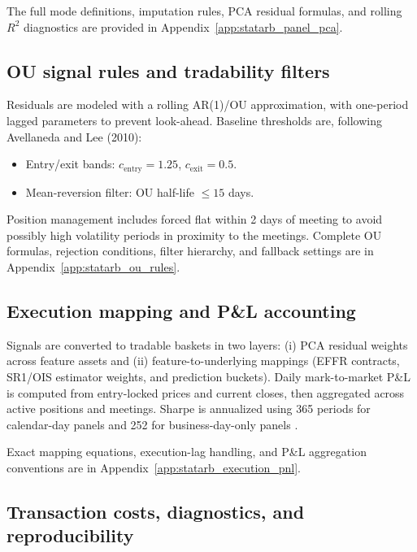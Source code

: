 The full mode definitions, imputation rules, PCA residual formulas, and rolling $R^2$ diagnostics are provided in Appendix~\ref{app:statarb_panel_pca}.

\subsection{OU signal rules and tradability filters}

Residuals are modeled with a rolling AR(1)/OU approximation, with one-period lagged parameters to prevent look-ahead. Baseline thresholds are, following Avellaneda and Lee (2010):
\begin{itemize}
    \item Entry/exit bands: $c_{\text{entry}}=1.25$, $c_{\text{exit}}=0.5$.
    \item Mean-reversion filter: OU half-life $\le 15$ days.
\end{itemize}
Position management includes forced flat within 2 days of meeting to avoid possibly high volatility periods in proximity to the meetings. Complete OU formulas, rejection conditions, filter hierarchy, and fallback settings are in Appendix~\ref{app:statarb_ou_rules}.

\subsection{Execution mapping and P\&L accounting}

Signals are converted to tradable baskets in two layers: (i) PCA residual weights across feature assets and (ii) feature-to-underlying mappings (EFFR contracts, SR1/OIS estimator weights, and prediction buckets). Daily mark-to-market P\&L is computed from entry-locked prices and current closes, then aggregated across active positions and meetings. Sharpe is annualized using 365 periods for calendar-day panels and 252 for business-day-only panels \cite{sharpe1994}.

Exact mapping equations, execution-lag handling, and P\&L aggregation conventions are in Appendix~\ref{app:statarb_execution_pnl}.


\subsection{Transaction costs, diagnostics, and reproducibility}
\label{TCs}

